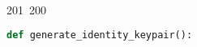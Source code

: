 201~200~\documentclass{article}
\begin{document}
	                                                                                                                                                                                                                                                                                                	                                                                                                                                        	    	                                                                                                	                                                                                                                                                                                                                                                                                                                                	                                                                        	                                                                        	                                                                                                                                        	                                                                                                                                                                                    \begin{lstlisting}[language=Python, caption=Key Pair Generation]
	                                                                                                                                                                                                                                                                                                	                                                                                                                                        	    	                                                                                                	                                                                                                                                                                                                                                                                                                                                	                                                                        	                                                                        	                                                                                                                                        	                                                                                                                                                                                    def generate_identity_keypair():

\end{lstlisting}
\end{document}
